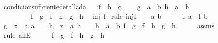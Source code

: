 \begin{isabellebody}
\ condicion{\isacharunderscore}suficiente{\isacharunderscore}detallada{\isacharcolon}\isanewline
\ \ \ f\ {\isacharcolon}{\isacharcolon}\ {\isachardoublequoteopen}{\isacharprime}b\ {\isasymRightarrow}\ {\isacharprime}c{\isachardoublequoteclose}\ \isanewline
\ \ \ {\isachardoublequoteopen}{\isasymforall}{\isacharparenleft}g\ {\isacharcolon}{\isacharcolon}\ {\isacharprime}a\ {\isasymRightarrow}\ {\isacharprime}b{\isacharparenright}\ {\isacharparenleft}h\ {\isacharcolon}{\isacharcolon}\ {\isacharprime}a\ {\isasymRightarrow}\ {\isacharprime}b{\isacharparenright}{\isachardot}\isanewline
\ \ \ \ \ \ \ \ \ {\isacharparenleft}f\ {\isasymcirc}\ g\ {\isacharequal}\ f\ {\isasymcirc}\ h\ {\isasymlongrightarrow}\ g\ {\isacharequal}\ h{\isacharparenright}{\isachardoublequoteclose}\isanewline
{}\ {\isachardoublequoteopen}\ inj\ f{\isachardoublequoteclose}\isanewline
%
\isadelimproof
%
\endisadelimproof
%
\isatagproof
{}\isamarkupfalse%
\ {\isacharparenleft}rule\ injI{\isacharparenright}\isanewline
\ \ \isamarkupfalse%
\ a\ b\ \isanewline
\ \ \isamarkupfalse%
\ {}{\isacharcolon}\ {\isachardoublequoteopen}f\ a\ {\isacharequal}\ f\ b\ {\isachardoublequoteclose}\isanewline
\ \ \isamarkupfalse%
\ {\isacharquery}g\ {\isacharequal}\ {\isachardoublequoteopen}{\isasymlambda}x\ {\isacharcolon}{\isacharcolon}\ {\isacharprime}a{\isachardot}\ a{\isachardoublequoteclose}\isanewline
\ \ \isamarkupfalse%
\ {\isacharquery}h\ {\isacharequal}\ {\isachardoublequoteopen}{\isasymlambda}x\ {\isacharcolon}{\isacharcolon}\ {\isacharprime}a{\isachardot}\ b{\isachardoublequoteclose}\isanewline
\ \ \isamarkupfalse%
\ {\isachardoublequoteopen}{\isasymforall}{\isacharparenleft}h\ {\isacharcolon}{\isacharcolon}\ {\isacharprime}a\ {\isasymRightarrow}\ {\isacharprime}b{\isacharparenright}{\isachardot}\ {\isacharparenleft}f\ {\isasymcirc}\ {\isacharquery}g\ {\isacharequal}\ f\ {\isasymcirc}\ h\ {\isasymlongrightarrow}\ {\isacharquery}g\ {\isacharequal}\ h{\isacharparenright}{\isachardoublequoteclose}\isanewline
\ \ \ \ \isamarkupfalse%
\ assms\ \isamarkupfalse%
\ {\isacharparenleft}rule\ allE{\isacharparenright}\isanewline
\ \ \isamarkupfalse%
\ {}{\isacharcolon}\ {\isachardoublequoteopen}\ {\isacharparenleft}f\ {\isasymcirc}\ {\isacharquery}g\ {\isacharequal}\ f\ {\isasymcirc}\ {\isacharquery}h\ {\isasymlongrightarrow}\ {\isacharquery}g\ {\isacharequal}\ {\isacharquery}h{\isacharparenright}{\isachardoublequoteclose}\ \ \isamarkupfalse%

\end{isabellebody}
